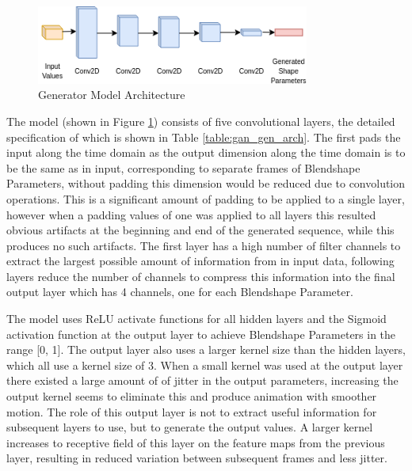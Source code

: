 \begin{figure}[h!]
    \centering
        \includegraphics[width=0.8\textwidth]{figures/gan/generator.png}
    \caption{Generator Model Architecture}\label{fig:gan_gen_arch}
\end{figure}

The model (shown in Figure \ref{fig:gan_gen_arch}) consists of five convolutional layers, the detailed specification of which is shown in Table \ref{table:gan_gen_arch}.
The first pads the input along the time domain as the output dimension along the time domain is to be the same as in input, corresponding to separate frames of Blendshape Parameters, without padding this dimension would be reduced due to convolution operations.
This is a significant amount of padding to be applied to a single layer, however when a padding values of one was applied to all layers this resulted obvious artifacts at the beginning and end of the generated sequence, while this produces no such artifacts.
The first layer has a high number of filter channels to extract the largest possible amount of information from in input data, following layers reduce the number of channels to compress this information into the final output layer which has 4 channels, one for each Blendshape Parameter.

The model uses ReLU activate functions for all hidden layers and the Sigmoid activation function at the output layer to achieve Blendshape Parameters in the range [0, 1].
The output layer also uses a larger kernel size than the hidden layers, which all use a kernel size of 3.
When a small kernel was used at the output layer there existed a large amount of of jitter in the output parameters, increasing the output kernel seems to eliminate this and produce animation with smoother motion.
The role of this output layer is not to extract useful information for subsequent layers to use, but to generate the output values.
A larger kernel increases to receptive field of this layer on the feature maps from the previous layer, resulting in reduced variation between subsequent frames and less jitter.

